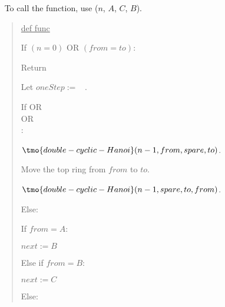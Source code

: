 \documentclass[10pt]{article}
\begin{document}
\begin{solution}\ %
  To call the function, use (\( n \), \( A \), \( C \), \( B \)).
  \begin{quote}
  \noindent\ul{def func }%

  \begin{steps}
    \item If \( (n = 0) \) OR \( (from = to) \):
      \begin{steps}
        \item Return
      \end{steps}
    \item Let \(oneStep := \) \boolF~.
    \item If \big[(\( from = A \)) AND (\( to = B \))\big] OR \\
      \nf{\quad}\big[(\( from = B \)) AND (\( to = C \))\big] OR \\
      \nf{\quad}\big[(\( from = C \)) AND (\( to = A \))\big]: 
        \begin{steps}
        \item \( \tmo{double-cyclic-Hanoi}(n - 1, from, spare, to) \).
        \item Move the top ring from \( from \) to \( to \).
        \item \( \tmo{double-cyclic-Hanoi}(n - 1, spare, to, from) \).
        \end{steps}
    \setcounter{stepsi}{3}
      \item Else: 
        \begin{steps}
        \item If \(from = A\):
          \begin{steps}
          \item \(next := B\)
          \end{steps}
        \item Else if \(from = B\):
          \begin{steps}
          \item \(next := C\)
          \end{steps}
        \item Else:

\end{steps}
\end{steps}
\end{quote}
\end{solution}
\end{document}

